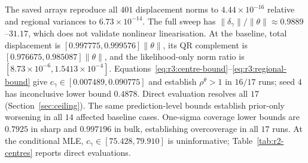 The saved arrays reproduce all $401$ displacement norms to $4.44\times10^{-16}$
relative and regional variances to $6.73\times10^{-14}$.
The full sweep has $\|\delta_\gamma\|/\|\theta\|\approx0.9889$--$31.17$, which does
not validate nonlinear linearisation. At the baseline, total displacement is
$[0.997775,0.999576]\|\theta\|$, its QR complement is
$[0.976675,0.985087]\|\theta\|$, and the likelihood-only norm ratio is
$[8.73\times10^{-6},1.5413\times10^{-4}]$.
Equations~\eqref{eq:r3:centre-bound}--\eqref{eq:r3:regional-bound} give
$c_\gamma\in[0.007489,0.090775]$ and establish $\rho^\theta>1$ in $16/17$ runs;
seed $4$ has inconclusive lower bound $0.4878$. Direct evaluation resolves all
$17$ (Section~\ref{sec:ceiling}). The same prediction-level bounds establish
prior-only worsening in all $14$ affected baseline cases. One-sigma coverage
lower bounds are $0.7925$ in sharp and $0.997196$ in bulk, establishing
overcoverage in all $17$ runs. At the conditional MLE,
$c_\gamma\in[75.428,79.910]$ is uninformative; Table~\ref{tab:r2-centres}
reports direct evaluations.
